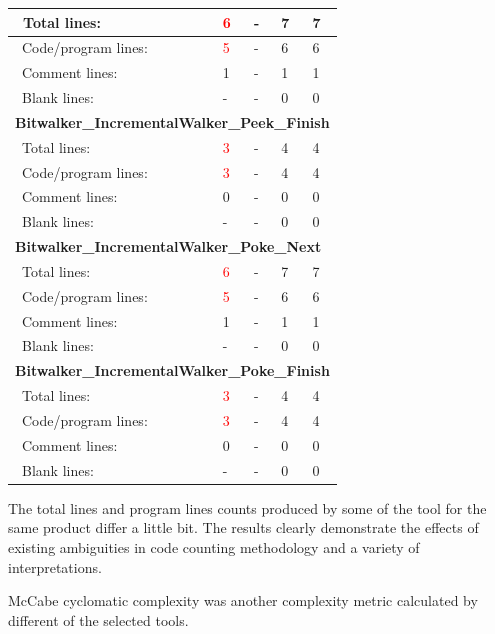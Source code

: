 \begin{longtable}{||p{}|p{}|p{}|p{}|p{}||}
\\\hline
\ Total lines: & \textcolor{red}{6} & - & 7 & 7
\\\hline
\ Code/program lines: & \textcolor{red}{5} & - & 6 & 6
\\\hline
\ Comment lines: & 1 & - & 1 & 1 
\\\hline
\ Blank lines: & - & - & 0 & 0
 \\\hline
 \multicolumn{5}{||l||}{\textbf{Bitwalker\_IncrementalWalker\_Peek\_Finish}}
\\\hline
\ Total lines: & \textcolor{red}{3} & - & 4 & 4
\\\hline
\ Code/program lines: & \textcolor{red}{3} & - & 4 & 4
\\\hline
\ Comment lines: & 0 & - & 0 & 0 
\\\hline
\ Blank lines: & - & - & 0 & 0
 \\\hline
 \multicolumn{5}{||l||}{\textbf{Bitwalker\_IncrementalWalker\_Poke\_Next}}
\\\hline
\ Total lines: & \textcolor{red}{6} & - & 7 & 7
\\\hline
\ Code/program lines: & \textcolor{red}{5} & - & 6 & 6
\\\hline
\ Comment lines: & 1 & - & 1 & 1 
\\\hline
\ Blank lines: & - & - & 0 & 0
 \\\hline
 \multicolumn{5}{||l||}{\textbf{Bitwalker\_IncrementalWalker\_Poke\_Finish}}
\\\hline
\ Total lines: & \textcolor{red}{3} & - & 4 & 4
\\\hline
\ Code/program lines: & \textcolor{red}{3} & - & 4 & 4
\\\hline
\ Comment lines: & 0 & - & 0 & 0 
\\\hline
\ Blank lines: & - & - & 0 & 0
 \\\hline
\end{longtable}

The total lines and program lines counts produced by some of the tool for the same product differ a little bit. 
The results clearly demonstrate the effects of existing ambiguities in code counting methodology and a variety of interpretations.

McCabe cyclomatic complexity was another complexity metric calculated by different of the selected tools. 

